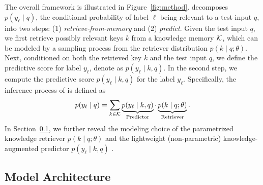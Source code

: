 The overall framework is illustrated in Figure~\ref{fig:method}. 
\RAEXMC decomposes $p(y_\ell \mid  q)$, the conditional probability of label $\ell$ being relevant to a test input $q$, into two steps: (1) \textit{retrieve-from-memory} and (2) \textit{predict}.
Given the test input $q$, we first retrieve possibly relevant
keys $k$ from a knowledge memory ${\mathcal{K}}$, which can be modeled by a sampling process from the retriever distribution $p(k \mid q; \theta)$.
Next, conditioned on both the retrieved key $k$ and the test input $q$,
we define the predictive score for label $y_\ell$, denote as $p(y_\ell \mid k, q)$.
In the second step, we compute the predictive score $p(y_\ell \mid k, q)$ for the label $y_\ell$.
Specifically, the inference process of \RAEXMC is defined as 
\begin{equation}
    p(y_\ell \mid q) = \sum_{k \in {\mathcal{K}}}
    \underbrace{p(y_\ell  \mid  k, q)}_{\text{Predictor}} \cdot
    \underbrace{p(k  \mid  q; \theta)}_{\text{Retriever}}.
    \label{eq:rae-score}
\end{equation}
In Section~\ref{sec:rae-modeling}, we further reveal the modeling choice of the parametrized knowledge retriever $p(k  \mid  q; \theta)$ and the lightweight (non-parametric) knowledge-augmented predictor $p(y_\ell  \mid  k, q)$ . 



\subsection{Model Architecture}
\label{sec:rae-modeling}

